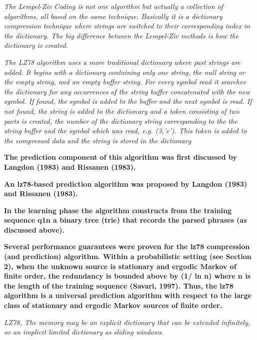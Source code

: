 \emph{The Lempel-Ziv Coding is not one algorithm but actually a collection of algorithms, all based on the same technique. Basically it is a dictionary compression technique where strings are switched to their corresponding index in the dictionary. The big difference between the Lempel-Ziv methods is how the dictionary is created. }~\cite{Mans Andersson}

\emph{The LZ78 algorithm uses a more traditional dictionary where past strings are added. It begins with a dictionary containing only one string, the null string or the empty string, and an empty buffer string. For every symbol read it searches the dictionary for any occurrences of the string buffer concatenated with the new symbol. If found, the symbol is added to the buffer and the next symbol is read. If not found, the string is added to the dictionary and a token consisting of two parts is created, the number of the dictionary string corresponding to the the string buffer and the symbol which was read, e.g. (3,’e’). This token is added to the compressed data and the string is stored in the dictionary}~\cite{Mans Andersson}



\textbf{The prediction component of this algorithm was first discussed by Langdon (1983) and Rissanen (1983).}~\cite{Begleiter2004}

 
\textbf{An lz78-based prediction algorithm was proposed by Langdon (1983) and Rissanen (1983).}~\cite{Begleiter2004}


\textbf{In the learning phase the algorithm constructs from the training sequence q1n a binary tree (trie) that records the parsed phrases (as discussed above).}~\cite{Begleiter2004}

\textbf{Several performance guarantees were proven for the lz78 compression (and prediction)
algorithm. Within a probabilistic setting (see Section 2), when the unknown source is stationary and ergodic Markov of finite order, the redundancy is bounded above by (1/ ln n) where n is the length of the training sequence (Savari, 1997). Thus, the lz78 algorithm is a universal prediction algorithm with respect to the large class of stationary and ergodic Markov sources of finite order.}~\cite{Begleiter2004}


\emph{LZ78, The memory may be an explicit dictionary that can be extended infinitely, or an implicit limited dictionary as sliding windows.}~\cite{MengyiPu2006}




\emph{}~\cite{}
\emph{}~\cite{}
\emph{}~\cite{}
\emph{}~\cite{}
\emph{}~\cite{}





